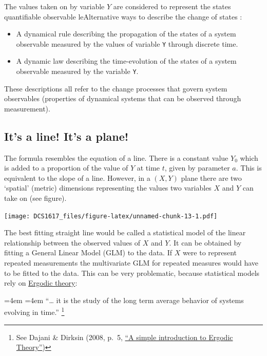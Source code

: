 \documentclass[]{book}
\providecommand{\tightlist}{%
  \setlength{\itemsep}{0pt}\setlength{\parskip}{0pt}}
\let\rmarkdownfootnote\footnote%
\def\footnote{\protect\rmarkdownfootnote}
\renewenvironment{quote}{%
  \par \small \medskip \block
  \leftskip=4em \rightskip=4em%
  \noindent \ignorespaces}{%
  \par \medskip
  }
\begin{document}
The values taken on by variable \(Y\) are considered to represent the
states quantifiable observable leAlternative ways to describe the change
of states :

\begin{itemize}
\tightlist
\item
  A dynamical rule describing the propagation of the states of a system
  observable measured by the values of variable \texttt{Y} through
  discrete time.
\item
  A dynamic law describing the time-evolution of the states of a system
  observable measured by the variable \texttt{Y}.
\end{itemize}

These descriptions all refer to the change processes that govern system
observables (properties of dynamical systems that can be observed
through measurement).

\subsection*{\texorpdfstring{\textbf{It's a line! It's a
plane!}}{It's a line! It's a plane!}}\label{its-a-line-its-a-plane}

The formula resembles the equation of a line. There is a constant value
\(Y_{0}\) which is added to a proportion of the value of \(Y\) at time
\(t\), given by parameter \(a\). This is equivalent to the slope of a
line. However, in a \((X,Y)\) plane there are two `spatial' (metric)
dimensions representing the values two variables \(X\) and \(Y\) can
take on (see figure).

\texttt{[image: DCS1617\_files/figure-latex/unnamed-chunk-13-1.pdf]}

The best fitting straight line would be called a statistical model of
the linear relationship between the observed values of \(X\) and \(Y\).
It can be obtained by fitting a General Linear Model (GLM) to the data.
If \(X\) were to represent repeated measurements the multivariate GLM
for repeated measures would have to be fitted to the data. This can be
very problematic, because statistical models rely on
\href{https://en.wikipedia.org/wiki/Ergodic_theory}{Ergodic theory}:

\begin{quote}
``\ldots{} it is the study of the long term average behavior of systems
evolving in time.'' \footnote{See Dajani \& Dirksin (2008, p.~5,
  \href{http://www.staff.science.uu.nl/~kraai101/lecturenotes2009.pdf}{``A
  simple introduction to Ergodic Theory''})}
\end{quote}
\end{document}
